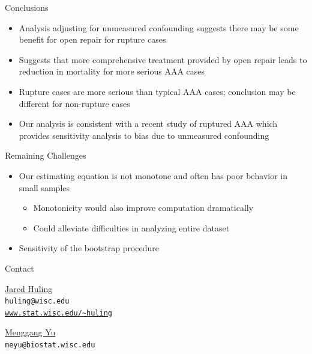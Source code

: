 \documentclass[final,plain]{beamer}
\newlength{\onecolwid}
\newlength{\halfcolwid}
\newlength{\twocolwid}
\newcommand{\bi}{\begin{itemize}}
\newcommand{\ei}{\end{itemize}}
\newcommand{\colonevsep}{\vspace{16mm}}
\begin{document}
\begin{frame}[t]
\begin{columns}[t]
\begin{column}{\twocolwid}
\begin{columns}[t]
\begin{column}{\onecolwid}
    \begin{exampleblock}{\Large Conclusions}

	\vspace{8pt}

	         \bi \itemsep14pt
	           \item Analysis adjusting for unmeasured confounding suggests there may be some benefit for open repair for rupture cases
		\item Suggests that more comprehensive treatment provided by open repair leads to reduction in mortality for more serious AAA cases
	           \item Rupture cases are more serious than typical AAA cases; conclusion may be different for non-rupture cases
		\item Our analysis is consistent with a recent study of ruptured AAA which provides sensitivity analysis to bias due to unmeasured confounding \citep{edwards14}
	         \ei


    \end{exampleblock}


  \colonevsep %

    \begin{block}{\Large Remaining Challenges }{
      \bi
      \itemsep18pt
      \item Our estimating equation is not monotone and often has poor behavior in small samples
	\bi
		\item Monotonicity would also improve computation dramatically
		\item Could alleviate difficulties in analyzing entire dataset
	\ei
      \item Sensitivity of the bootstrap procedure 
      \ei
    }
    \end{block}

  \colonevsep %

    \begin{block}{Contact}
	\noindent
        \begin{minipage}[t]{0.9\halfcolwid}
        \href{http://www.stat.wisc.edu/~huling}{Jared Huling}\\
        {\tt huling@wisc.edu}\\
        \href{http://www.stat.wisc.edu/~huling}{\tt www.stat.wisc.edu/{\textasciitilde}huling} \\
        \end{minipage}
\hfill
      \hspace{-1em}
	\noindent
        \begin{minipage}[t]{0.95\halfcolwid}
        \href{http://www.biostat.wisc.edu/content/yu-menggang}{Menggang Yu}\\
        {\tt meyu@biostat.wisc.edu}\\
        \end{minipage}



\end{block}
\end{column}
\end{columns}
\end{column}
\end{columns}
\end{frame}
\end{document}
